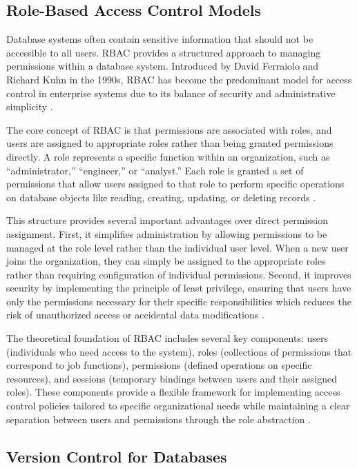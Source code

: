 \subsection{Role-Based Access Control Models}
\label{subsec:role-based-access-control}

Database systems often contain sensitive information that should not be accessible to all users. \ac{RBAC} provides a structured approach to managing permissions within a database system. Introduced by David Ferraiolo and Richard Kuhn in the 1990s, \ac{RBAC} has become the predominant model for access control in enterprise systems due to its balance of security and administrative simplicity \cite{sandhu1998role}.

The core concept of \ac{RBAC} is that permissions are associated with roles, and users are assigned to appropriate roles rather than being granted permissions directly. A role represents a specific function within an organization, such as ``administrator,'' ``engineer,'' or ``analyst.'' Each role is granted a set of permissions that allow users assigned to that role to perform specific operations on database objects like reading, creating, updating, or deleting records \cite{ferraiolo2011policy}.

This structure provides several important advantages over direct permission assignment. First, it simplifies administration by allowing permissions to be managed at the role level rather than the individual user level. When a new user joins the organization, they can simply be assigned to the appropriate roles rather than requiring configuration of individual permissions. Second, it improves security by implementing the principle of least privilege, ensuring that users have only the permissions necessary for their specific responsibilities which reduces the risk of unauthorized access or accidental data modifications \cite{sandhu1998role}.

The theoretical foundation of \ac{RBAC} includes several key components: users (individuals who need access to the system), roles (collections of permissions that correspond to job functions), permissions (defined operations on specific resources), and sessions (temporary bindings between users and their assigned roles). These components provide a flexible framework for implementing access control policies tailored to specific organizational needs while maintaining a clear separation between users and permissions through the role abstraction \cite{sandhu1997arbac97}.


\subsection{Version Control for Databases}
\label{subsec:database-versioning}


